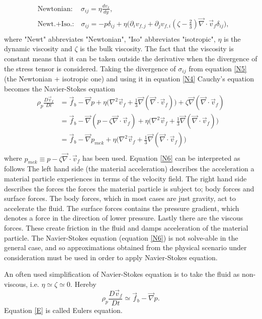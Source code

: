 \begin{equation}
	\begin{split}
		&\text{Newtonian:} \quad\, \sigma_{ij}=\eta\frac{d v_x}{dy},\\
		&\text{Newt.+Iso.:} \quad \sigma_{ij}=-p\delta_{ij}+\eta\bigg(\partial_iv_{f,j}+\partial_jv_{f,i}(\zeta-\frac{2}{3})\vec{\nabla}\cdot \vec{v}_f\delta_{ij}\bigg),\\
	\end{split}
	\label{N5}
\end{equation} 
where "Newt" abbreviates "Newtonian", "Iso" abbreviates "isotropic", $\eta$ is the dynamic viscosity and $\zeta$ is the bulk viscosity. The fact that the viscosity is constant means that it can be taken outside the derivative when the divergence of the stress tensor is considered. Taking the divergence of $\sigma_{ij}$ from equation \eqref{N5} (the Newtonian + isotropic one) and using it in equation \eqref{N4} Cauchy's equation becomes the Navier-Stokes equation
\begin{equation}
	\begin{split}
		\rho_p\frac{D\vec{v}_f}{Dt}&=\vec{f}_{b}-\vec{\nabla}p+\eta\bigg(\nabla^2\vec{v}_f+\frac{1}{3}\vec{\nabla}(\vec{\nabla}\cdot\vec{v}_f)\bigg)+\zeta\vec{\nabla}(\vec{\nabla}\cdot \vec{v}_f)\\
		&=\vec{f}_{b}-\vec{\nabla}(p-\zeta\vec{\nabla}\cdot \vec{v}_f)+\eta\bigg(\nabla^2\vec{v}_f+\frac{1}{3}\vec{\nabla}(\vec{\nabla}\cdot\vec{v}_f)\bigg)\\
		&=\vec{f}_{b}-\vec{\nabla}p_{mek}+\eta\bigg(\nabla^2\vec{v}_f+\frac{1}{3}\vec{\nabla}(\vec{\nabla}\cdot\vec{v}_f)\bigg)\\
	\end{split}
	\label{N6}
\end{equation} 
where $p_{mek}\equiv p-\zeta\vec{\nabla}\cdot \vec{v}_f$ has been used. Equation \eqref{N6} can be interpreted as follows The left hand side (the material acceleration) describes the acceleration a material particle experiences in terms of the velocity field. The right hand side describes the forces the forces the material particle is subject to; body forces and surface forces. The body forces, which in most cases are just gravity, act to accelerate the fluid. The surface forces contains the pressure gradient, which denotes a force in the direction of lower pressure. Lastly there are the viscous forces. These create friction in the fluid and damps acceleration of the material particle. 
The Navier-Stokes equation (equation \eqref{N6}) is not solve-able in the general case, and so approximations obtained from the physical scenario under consideration must be used in order to apply Navier-Stokes equation. 
\begin{example}
	An often used simplification of Navier-Stokes equation is to take the fluid as non-viscous, i.e. $\eta\simeq\zeta\simeq0$. Hereby
	\begin{equation}
		\rho_p\frac{D\vec{v}_f}{Dt}\simeq \vec{f}_{b}-\vec{\nabla}p.
		\label{E}
	\end{equation} 
	Equation \eqref{E} is called Eulers equation.
\end{example}

